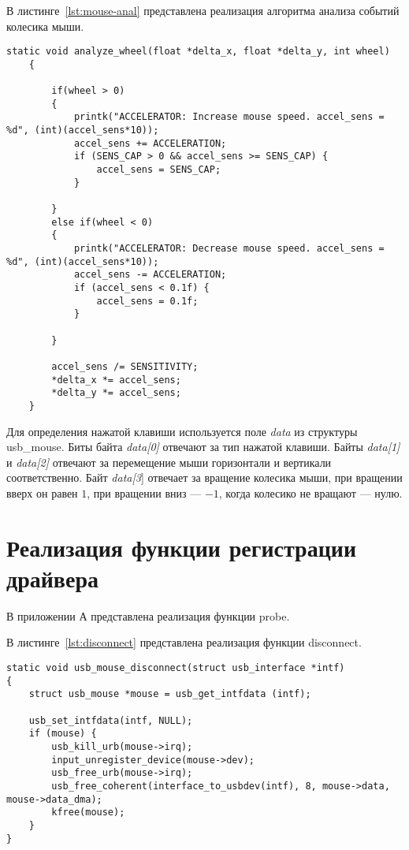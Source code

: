 В листинге~\ref{lst:mouse-anal} представлена реализация алгоритма анализа событий колесика мыши. 

\captionsetup{justification=raggedright,singlelinecheck=off}
\begin{lstlisting}[label=lst:mouse-anal, caption= Реализация анализа событий колесика мыши]
	static void analyze_wheel(float *delta_x, float *delta_y, int wheel)
	{
		
		if(wheel > 0)
		{
			printk("ACCELERATOR: Increase mouse speed. accel_sens = %d", (int)(accel_sens*10));
			accel_sens += ACCELERATION;
			if (SENS_CAP > 0 && accel_sens >= SENS_CAP) {
				accel_sens = SENS_CAP;
			}
			
		}
		else if(wheel < 0)
		{
			printk("ACCELERATOR: Decrease mouse speed. accel_sens = %d", (int)(accel_sens*10));
			accel_sens -= ACCELERATION;
			if (accel_sens < 0.1f) {
				accel_sens = 0.1f;
			}
			
		}
		
		accel_sens /= SENSITIVITY;
		*delta_x *= accel_sens;
		*delta_y *= accel_sens;
	}
\end{lstlisting}

Для определения нажатой клавиши используется поле \textit{data} из структуры usb\_mouse. Биты байта \textit{data[0]} отвечают за тип нажатой клавиши. Байты \textit{data[1]} и \textit{data[2]} отвечают за перемещение мыши горизонтали и вертикали соответственно. Байт \textit{data[3}] отвечает за вращение колесика мыши, при вращении вверх он равен $1$, при вращении вниз --- $-1$, когда колесико не вращают --- нулю.

\section{Реализация функции регистрации драйвера}

В приложении А представлена реализация функции probe.

В листинге~\ref{lst:disconnect} представлена реализация функции disconnect.
\begin{lstlisting}[label=lst:disconnect, caption=Реализация функции disconnect]
static void usb_mouse_disconnect(struct usb_interface *intf)
{
	struct usb_mouse *mouse = usb_get_intfdata (intf);
	
	usb_set_intfdata(intf, NULL);
	if (mouse) {
		usb_kill_urb(mouse->irq);
		input_unregister_device(mouse->dev);
		usb_free_urb(mouse->irq);
		usb_free_coherent(interface_to_usbdev(intf), 8, mouse->data, mouse->data_dma);
		kfree(mouse);
	}
}
\end{lstlisting}

